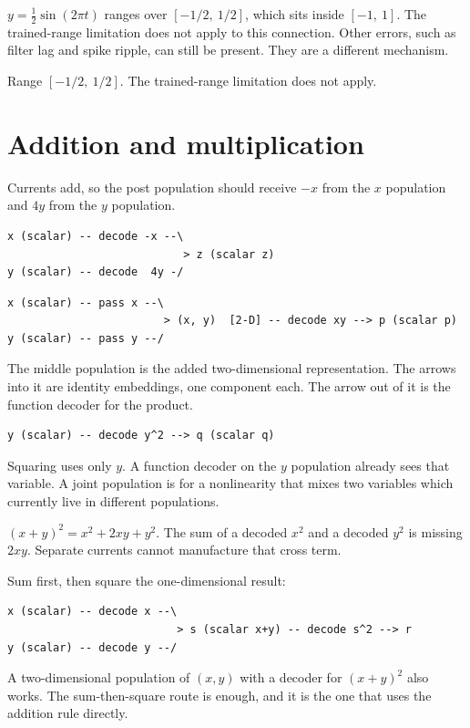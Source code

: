\documentclass[11pt,letterpaper]{article}
\newcommand{\ans}[1]{\par\vspace{2pt}{\bfseries #1}\quad}
\begin{document}
\ans{2.}
$y = \tfrac12\sin(2\pi t)$ ranges over $[-1/2,\ 1/2]$, which sits inside $[-1,\ 1]$. The trained-range limitation does not apply to this connection. Other errors, such as filter lag and spike ripple, can still be present. They are a different mechanism.
\begin{result}
Range $[-1/2,\ 1/2]$. The trained-range limitation does not apply.
\end{result}

\section{Addition and multiplication}

\ans{1.}
Currents add, so the post population should receive $-x$ from the $x$ population and $4y$ from the $y$ population.
\begin{result}
\begin{verbatim}
x (scalar) -- decode -x --\
                           > z (scalar z)
y (scalar) -- decode  4y -/
\end{verbatim}
\end{result}

\ans{2.}
\begin{result}
\begin{verbatim}
x (scalar) -- pass x --\
                        > (x, y)  [2-D] -- decode xy --> p (scalar p)
y (scalar) -- pass y --/
\end{verbatim}
\end{result}
The middle population is the added two-dimensional representation. The arrows into it are identity embeddings, one component each. The arrow out of it is the function decoder for the product.

\ans{3.}
\begin{result}
\begin{verbatim}
y (scalar) -- decode y^2 --> q (scalar q)
\end{verbatim}
\end{result}
Squaring uses only $y$. A function decoder on the $y$ population already sees that variable. A joint population is for a nonlinearity that mixes two variables which currently live in different populations.

\ans{4.}
$(x+y)^2 = x^2 + 2xy + y^2$. The sum of a decoded $x^2$ and a decoded $y^2$ is missing $2xy$. Separate currents cannot manufacture that cross term.

Sum first, then square the one-dimensional result:
\begin{result}
\begin{verbatim}
x (scalar) -- decode x --\
                          > s (scalar x+y) -- decode s^2 --> r
y (scalar) -- decode y --/
\end{verbatim}
\end{result}
A two-dimensional population of $(x, y)$ with a decoder for $(x+y)^2$ also works. The sum-then-square route is enough, and it is the one that uses the addition rule directly.
\end{document}
